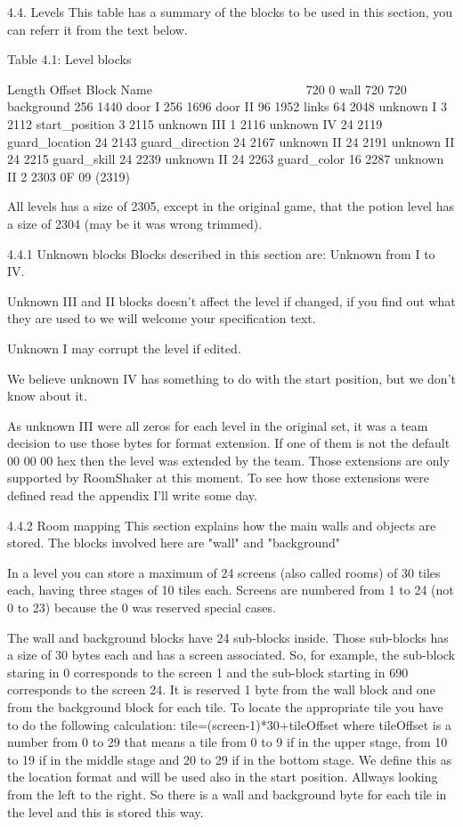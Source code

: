 4.4. Levels
 This table has a summary of the blocks to be used in this section,
 you can referr it from the text below.

                   Table 4.1: Level blocks
                   ~~~~~~~~~~~~~~~~~~~~~~~

  Length Offset  Block Name
  ~~~~~~ ~~~~~~  ~~~~~~~~~~
  720    0       wall
  720    720     background
  256    1440    door I
  256    1696    door II
  96     1952    links
  64     2048    unknown I
  3      2112    start_position
  3      2115    unknown III
  1      2116    unknown IV
  24     2119    guard_location
  24     2143    guard_direction
  24     2167    unknown II
  24     2191    unknown II
  24     2215    guard_skill
  24     2239    unknown II
  24     2263    guard_color
  16     2287    unknown II
  2      2303    0F 09 (2319)

 All levels has a size of 2305, except in the original game, that the
 potion level has a size of 2304 (may be it was wrong trimmed).

4.4.1 Unknown blocks
 Blocks described in this section are: Unknown from I to IV.

 Unknown III and II blocks doesn't affect the level if changed, if you find
 out what they are used to we will welcome your specification text.

 Unknown I may corrupt the level if edited.

 We believe unknown IV has something to do with the start position, but we
 don't know about it.

 As unknown III were all zeros for each level in the original set, it was a
 team decision to use those bytes for format extension. If one of them is
 not the default 00 00 00 hex then the level was extended by the team.
 Those extensions are only supported by RoomShaker at this  moment. To see
 how those extensions were defined read the appendix I'll write some day.

4.4.2 Room mapping
 This section explains how the main walls and objects are stored. The
 blocks involved here are "wall" and "background"

 In a level you can store a maximum of 24 screens (also called rooms) of 30
 tiles each, having three stages of 10 tiles each. Screens are numbered
 from 1 to 24 (not 0 to 23) because the 0 was reserved special cases.

 The wall and background blocks have 24 sub-blocks inside. Those sub-blocks
 has a size of 30 bytes each and has a screen associated. So, for example,
 the sub-block staring in 0 corresponds to the screen 1 and the sub-block
 starting in 690 corresponds to the screen 24.
 It is reserved 1 byte from the wall block and one from the background
 block for each tile. To locate the appropriate tile you have to do the
 following calculation: tile=(screen-1)*30+tileOffset where tileOffset is a
 number
 from 0 to 29 that means a tile from 0 to 9 if in the upper stage, from
 10 to 19 if in the middle stage and 20 to 29 if in the bottom stage.
 We define this as the location format and will be used also in the start
 position.
 Allways looking from the left to the right.
 So there is a wall and background byte for each tile in the level and this
 is stored this way.

